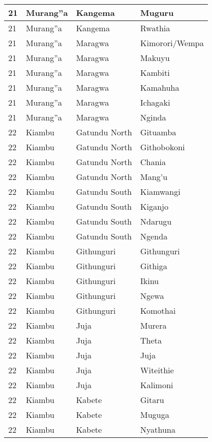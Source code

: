 \begin{table}[!ht]
\begin{tabular}{|l|l|l|l|}
        21 & Murang''a & Kangema & Muguru \\ \hline
        21 & Murang''a & Kangema & Rwathia \\ \hline
        21 & Murang''a & Maragwa & Kimorori/Wempa \\ \hline
        21 & Murang''a & Maragwa & Makuyu \\ \hline
        21 & Murang''a & Maragwa & Kambiti \\ \hline
        21 & Murang''a & Maragwa & Kamahuha \\ \hline
        21 & Murang''a & Maragwa & Ichagaki \\ \hline
        21 & Murang''a & Maragwa & Nginda \\ \hline
        22 & Kiambu & Gatundu North & Gituamba \\ \hline
        22 & Kiambu & Gatundu North & Githobokoni \\ \hline
        22 & Kiambu & Gatundu North & Chania \\ \hline
        22 & Kiambu & Gatundu North & Mang’u \\ \hline
        22 & Kiambu & Gatundu South & Kiamwangi \\ \hline
        22 & Kiambu & Gatundu South & Kiganjo \\ \hline
        22 & Kiambu & Gatundu South & Ndarugu \\ \hline
        22 & Kiambu & Gatundu South & Ngenda \\ \hline
        22 & Kiambu & Githunguri & Githunguri \\ \hline
        22 & Kiambu & Githunguri & Githiga \\ \hline
        22 & Kiambu & Githunguri & Ikinu \\ \hline
        22 & Kiambu & Githunguri & Ngewa \\ \hline
        22 & Kiambu & Githunguri & Komothai \\ \hline
        22 & Kiambu & Juja & Murera \\ \hline
        22 & Kiambu & Juja & Theta \\ \hline
        22 & Kiambu & Juja & Juja \\ \hline
        22 & Kiambu & Juja & Witeithie \\ \hline
        22 & Kiambu & Juja & Kalimoni \\ \hline
        22 & Kiambu & Kabete & Gitaru \\ \hline
        22 & Kiambu & Kabete & Muguga \\ \hline
        22 & Kiambu & Kabete & Nyathuna \\ \hline

\end{tabular}
\end{table}
